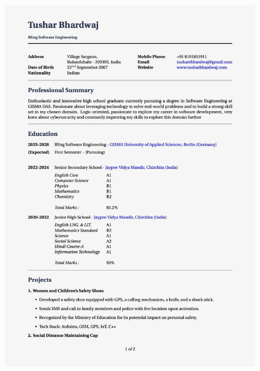 \documentclass{report}
\begin{document}
\begin{figure}[h]
    \centering
    \begin{minipage}{0.49\textwidth}
        \centering
        \includegraphics[width=1\linewidth]{CV/CV-pg1.jpeg}
    \end{minipage}
    \begin{minipage}{0.49\textwidth}
        \centering

\end{minipage}
\end{figure}
\end{document}
